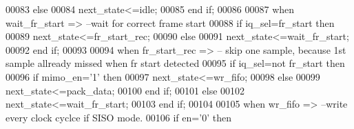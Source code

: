 \begin{DoxyCode}
00083             \textcolor{keywordflow}{else} 
00084                 \textcolor{vhdlchar}{next_state}\textcolor{vhdlchar}{<=}\textcolor{vhdlchar}{idle};
00085             \textcolor{keywordflow}{end} \textcolor{keywordflow}{if};
00086             
00087         \textcolor{keywordflow}{when} \textcolor{vhdlchar}{wait\_fr\_start} \textcolor{vhdlchar}{=}\textcolor{vhdlchar}{>}\textcolor{keyword}{       --wait for correct frame start }
00088             \textcolor{keywordflow}{if} \textcolor{vhdlchar}{iq_sel}\textcolor{vhdlchar}{=}\textcolor{vhdlchar}{fr_start} \textcolor{keywordflow}{then} 
00089                 \textcolor{vhdlchar}{next_state}\textcolor{vhdlchar}{<=}\textcolor{vhdlchar}{fr\_start\_rec};
00090             \textcolor{keywordflow}{else} 
00091                 \textcolor{vhdlchar}{next_state}\textcolor{vhdlchar}{<=}\textcolor{vhdlchar}{wait\_fr\_start};
00092             \textcolor{keywordflow}{end} \textcolor{keywordflow}{if};
00093             
00094         \textcolor{keywordflow}{when} \textcolor{vhdlchar}{fr\_start\_rec} \textcolor{vhdlchar}{=}\textcolor{vhdlchar}{>}\textcolor{keyword}{            -- skip one sample, because 1st sample allready missed when fr
       start detected}
00095             \textcolor{keywordflow}{if} \textcolor{vhdlchar}{iq_sel}\textcolor{vhdlchar}{=}\textcolor{keywordflow}{not} \textcolor{vhdlchar}{fr_start} \textcolor{keywordflow}{then} 
00096                 \textcolor{keywordflow}{if} \textcolor{vhdlchar}{mimo_en}\textcolor{vhdlchar}{=}\textcolor{vhdlchar}{'}\textcolor{vhdllogic}{}\textcolor{vhdllogic}{1}\textcolor{vhdlchar}{'} \textcolor{keywordflow}{then}  
00097                   \textcolor{vhdlchar}{next_state}\textcolor{vhdlchar}{<=}\textcolor{vhdlchar}{wr\_fifo};
00098                 \textcolor{keywordflow}{else} 
00099                     \textcolor{vhdlchar}{next_state}\textcolor{vhdlchar}{<=}\textcolor{vhdlchar}{pack\_data};
00100                 \textcolor{keywordflow}{end} \textcolor{keywordflow}{if};
00101             \textcolor{keywordflow}{else} 
00102                 \textcolor{vhdlchar}{next_state}\textcolor{vhdlchar}{<=}\textcolor{vhdlchar}{wait\_fr\_start};
00103             \textcolor{keywordflow}{end} \textcolor{keywordflow}{if};
00104 
00105         \textcolor{keywordflow}{when} \textcolor{vhdlchar}{wr\_fifo} \textcolor{vhdlchar}{=}\textcolor{vhdlchar}{>}\textcolor{keyword}{                 --write every clock cyclce if SISO mode.}
00106             \textcolor{keywordflow}{if} \textcolor{vhdlchar}{en}\textcolor{vhdlchar}{=}\textcolor{vhdlchar}{'}\textcolor{vhdllogic}{}\textcolor{vhdllogic}{0}\textcolor{vhdlchar}{'} \textcolor{keywordflow}{then} 

\end{DoxyCode}
